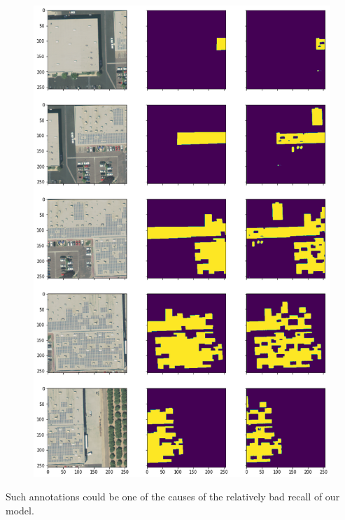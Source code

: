 \documentclass[a4paper, 12pt]{article}
\begin{document}
	\begin{figure}[H]
	    \centering
	    \includegraphics[height=0.92\textheight]{resources/png/beter_than_annotation.png}
	\end{figure}
	
	\begin{note}
	    Such annotations could be one of the causes of the relatively bad recall of our model.
	\end{note}
	
\end{document}
